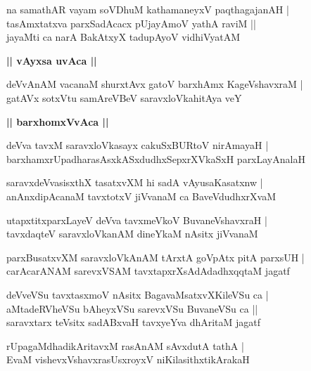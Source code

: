\documentclass[twoside,12pt,openright]{book}
\newcounter{shloka}[chapter]
\def\uvaca#1{\centerline{{\large\textbf{#1}}}}
\begin{document}
\begin{shloka}%
na samathAR vayam soVDhuM kathamaneyxV paqthagajanAH |\\
tasAmxtatxva parxSadAcacx pUjayAmoV yathA raviM ||\\
jayaMti ca narA BakAtxyX tadupAyoV vidhiVyatAM 
\end{shloka}

\uvaca{|| vAyxsa uvAca ||}

\begin{shloka}%
deVvAnAM vacanaM shurxtAvx gatoV barxhAmx KageVshavxraM |\\
gatAVx sotxVtu samAreVBeV saravxloVkahitAya veY
\end{shloka}

\uvaca{|| barxhomxVvAca ||}

\begin{shloka}%
deVva tavxM saravxloVkasayx cakuSxBURtoV nirAmayaH |\\
barxhamxrUpadharasAsxkASxdudhxSepxrXVkaSxH parxLayAnalaH 
\end{shloka}

\begin{shloka}%
saravxdeVvasisxthX tasatxvXM hi sadA vAyusaKasatxnw |\\
anAnxdipAcanaM tavxtotxV jiVvanaM ca BaveVdudhxrXvaM 
\end{shloka}

\begin{shloka}%
utapxtitxparxLayeV deVva tavxmeVkoV BuvaneVshavxraH |\\
tavxdaqteV saravxloVkanAM dineYkaM nAsitx jiVvanaM 
\end{shloka}

\begin{shloka}%
parxBusatxvXM saravxloVkAnAM tArxtA goVpAtx pitA parxsUH |\\
carAcarANAM sarevxVSAM tavxtapxrXsAdAdadhxqqtaM jagatf
\end{shloka}

\begin{shloka}%
deVveVSu tavxtasxmoV nAsitx BagavaMsatxvXKileVSu ca |\\
aMtadeRVheVSu bAheyxVSu sarevxVSu BuvaneVSu ca ||\\
saravxtarx teVsitx sadABxvaH tavxyeYva dhAritaM jagatf
\end{shloka}

\begin{shloka}%
rUpagaMdhadikAritavxM rasAnAM sAvxdutA tathA |\\
EvaM vishevxVshavxrasUsxroyxV niKilasithxtikArakaH 
\end{shloka}
\end{document}
